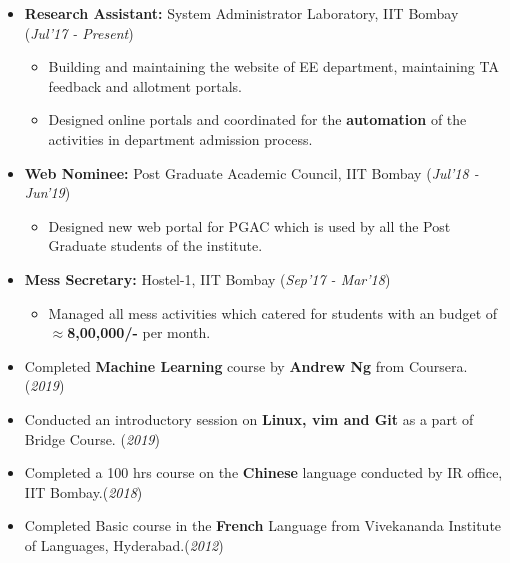 \documentclass[10pt]{article}
\begin{document}
\begin{itemize}[leftmargin=0.4cm]


\item \textbf {Research Assistant:} System Administrator Laboratory, IIT Bombay \hfill{(\textit{Jul'17 - Present})}
\begin{itemize}
    \item Building and maintaining the website of EE department, maintaining TA feedback and allotment portals.
    \item Designed online portals and coordinated for the \textbf{automation} of the activities in department admission process.
\end{itemize}
    


\item \textbf{Web Nominee:} Post Graduate Academic Council, IIT Bombay \hfill{(\textit{Jul'18 - Jun'19})}
\begin{itemize}
	\item Designed new web portal for PGAC which is used by all the Post Graduate students of the institute. 
\end{itemize}

\item \textbf{Mess Secretary:}  Hostel-1, IIT Bombay   \hfill{(\textit{Sep'17 - Mar'18})}
\begin{itemize}
	\item Managed all mess activities which catered for  students with an budget of \textbf{$\approx$8,00,000/-} per month.
\end{itemize}


\end{itemize}
%

\colorbox{bl}{} 

\begin{itemize}[leftmargin=0.4cm]
    \item { Completed \textbf{Machine Learning} course by \textbf{Andrew Ng} from Coursera. }\hfill{(\textit{2019})}
    \item {Conducted an introductory session on \textbf{Linux, vim and Git} as a part of Bridge Course. }\hfill{(\textit{2019})}
    \item {Completed a 100 hrs course on the \textbf{Chinese} language conducted by IR office, IIT Bombay.}\hfill{(\textit{2018})}
    \item {Completed Basic course in the \textbf{French} Language from Vivekananda Institute of Languages, Hyderabad.}\hfill{(\textit{2012})}
\end{itemize}

\end{document}
